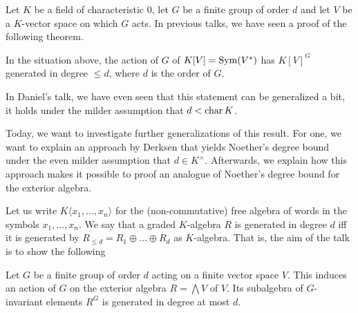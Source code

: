 \documentclass[../main.tex]{subfiles}
\begin{document}
Let $K$ be a field of characteristic $0$, let $G$ be a finite group of order $d$
and let $V$ be a $K$-vector space on which $G$ acts. In previous talks, we have 
seen a proof of the following theorem.

\begin{thm} \label{thm:classical}
    In the situation above, the action of $G$ of $K[V] = \operatorname{Sym}(V^*)$ has $K[V]^G$ generated
    in degree $\leq d$, where $d$ is the order of $G$.
\end{thm}

In Daniel's talk, we have even seen that this statement can be generalized a bit,
it holds under the milder assumption that $d < \operatorname{char} K$. 

Today, we want to investigate further generalizations of this result. 
For one, we want to explain an approach by Derksen \cite{DERKSENProofIdea} that
yields Noether's degree bound under the even milder assumption that $d \in
K^\times$. Afterwards, we explain how this approach makes it possible to
proof an analogue of Noether's degree bound for the exterior algebra.

Let us write $K\langle x_1, \dots, x_n \rangle$ for the (non-commutative) free
algebra of words in the symbols $x_1, \dots, x_n$. We say that a graded
$K$-algebra $R$ is generated in degree $d$ iff it is generated by $R_{\leq d} =
R_1 \oplus \dots \oplus R_d$ as $K$-algebra.  
That is, the aim of the talk is to show the following 

\begin{thm}\label{thm:mainthm}
    Let $G$ be a finite group of order $d$ acting on a finite vector space $V$.
    This induces an action of $G$ on the exterior algebra $R = \bigwedge V$ of $V$.
    Its subalgebra of $G$-invariant elements $R^G$ is generated in
    degree at most $d$.
\end{thm}
\end{document}
